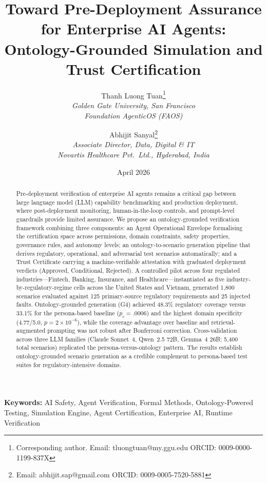 \documentclass[11pt,a4paper]{article}
\title{%
  Toward Pre-Deployment Assurance for Enterprise AI Agents:\\
  Ontology-Grounded Simulation and Trust Certification%
}
\author{
  Thanh Luong Tuan\thanks{Corresponding author. Email: tluongtuan@my.ggu.edu \quad ORCID: 0009-0000-1199-837X} \\
  \textit{Golden Gate University, San Francisco} \\
  \textit{Foundation AgenticOS (FAOS)}
  \and
  Abhijit Sanyal\thanks{Email: abhijit.sap@gmail.com \quad ORCID: 0009-0005-7520-5881} \\
  \textit{Associate Director, Data, Digital \& IT} \\
  \textit{Novartis Healthcare Pvt.\ Ltd., Hyderabad, India}
}
\date{April 2026}
\begin{document}
\maketitle

\begin{abstract}
Pre-deployment verification of enterprise AI agents remains a critical
gap between large language model (LLM) capability benchmarking and
production deployment, where post-deployment monitoring,
human-in-the-loop controls, and prompt-level guardrails provide
limited assurance. We propose an ontology-grounded verification
framework combining three components: an Agent Operational Envelope
formalising the certification space across permissions, domain
constraints, safety properties, governance rules, and autonomy levels;
an ontology-to-scenario generation pipeline that derives regulatory,
operational, and adversarial test scenarios automatically; and a Trust
Certificate carrying a machine-verifiable attestation with graduated
deployment verdicts (Approved, Conditional, Rejected). A controlled
pilot across four regulated industries---Fintech, Banking, Insurance,
and Healthcare---instantiated as five industry-by-regulatory-regime
cells across the United States and Vietnam, generated 1{,}800
scenarios evaluated against 125 primary-source regulatory requirements
and 25 injected faults. Ontology-grounded generation (G4) achieved
48.3\% regulatory coverage versus 33.1\% for the persona-based
baseline ($p_c{=}.0006$) and the highest domain specificity
(4.77/5.0, $p{=}2{\times}10^{-6}$), while the coverage advantage over
baseline and retrieval-augmented prompting was not robust after
Bonferroni correction. Cross-validation across three LLM families
(Claude Sonnet~4, Qwen~2.5 72B, Gemma~4 26B; 5{,}400 total scenarios)
replicated the persona-versus-ontology pattern. The results establish
ontology-grounded scenario generation as a credible complement to
persona-based test suites for regulatory-intensive domains.
\end{abstract}

\noindent\textbf{Keywords:} AI Safety, Agent Verification, Formal
Methods, Ontology-Powered Testing, Simulation Engine, Agent Certification,
Enterprise AI, Runtime Verification

\end{document}
